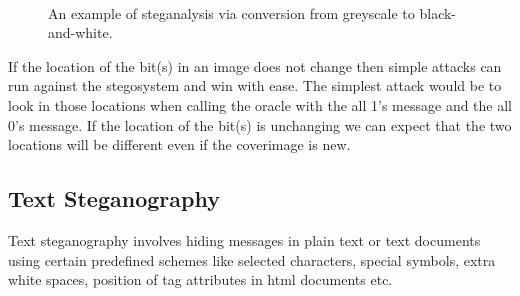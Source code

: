 \documentclass[11pt]{article}
\begin{document}
\begin{figure}[htbp]
  \centering
  \begin{minipage}[t]{.7\linewidth}
    \centering
    \\
    \caption{An example of steganalysis via conversion from greyscale
    to black-and-white.}
    \label{fig:stego-image}
  \end{minipage}
\end{figure}

If the location of the bit(s) in an image does not change then simple
attacks can run against the stegosystem and win with ease. The
simplest attack would be to look in those locations when calling the
oracle with  the all 1's message and the all 0's message. If the
location of the bit(s) is unchanging we can expect that the two
locations will be different even if the coverimage is new.

\subsection{Text Steganography}
\label{sub:text_steganography}
Text steganography involves hiding messages in plain text or text
documents using certain predefined schemes like selected characters,
special symbols, extra white spaces, position of tag attributes in
html documents etc. 
\end{document}
